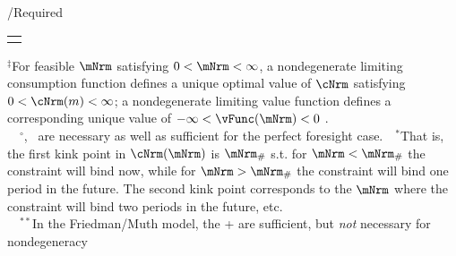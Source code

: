 \documentclass[\econtexRoot/BufferStockTheory]{subfiles}
\providecommand{\TblName}{}
\renewcommand{\TblName}{Required}
\begin{document}
\begin{verbatimwrite}{\TableDir/\TblName}
\begin{table}
{\begin{tabular}{|l|l|l|}
        \\ \hline \multicolumn{3}{c}{}
      \end{tabular}
    } %

    \settowidth\TableWidth{\usebox{\TblBox}}
    \savebox{\TblShrunkBox}{
      \settowidth{\TblShrunk}{\usebox{\TblBox}}
      \resizebox{\textwidth}{!}{\begin{minipage}{\TblShrunk}
          \usebox{\TblBox}
        \end{minipage}}
    }

    \usebox{\TblShrunkBox}


    \parbox{\textwidth}{\raggedright \footnotesize         $^{\ddagger}$For feasible $\mNrm$ satisfying $0 < \mNrm < \infty$, a nondegenerate limiting consumption function defines a unique optimal value of $\cNrm$ satisfying $0 < \cNrm(m) < \infty$; a nondegenerate limiting value function defines a corresponding unique value of $-\infty < \vFunc(\mNrm) < 0$ .\\
      ~~$^{\circ}${\RIC}, \FHWC~are necessary as well as sufficient for the perfect foresight case.~~$^{\ast}$That is, the first kink point in $\cNrm(\mNrm)$ is $\mNrm_{\#}$ s.t. for $\mNrm < \mNrm_{\#}$ the constraint will bind now, while for $\mNrm > \mNrm_{\#}$ the constraint will bind one period in the future.  The second kink point corresponds to the $\mNrm$ where the constraint will bind two periods in the future, etc.\\
      ~~$^{\ast\ast}$In the Friedman/Muth model, the {\RIC}+{\FHWC} are sufficient, but \textit{not} necessary for nondegeneracy} 
  \end{table}
  
\end{verbatimwrite}
\clearpage

\end{document}
